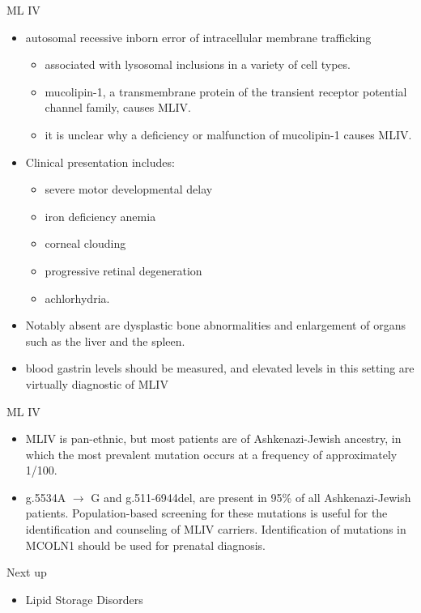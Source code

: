\documentclass[presentation, smaller]{beamer}
\begin{document}
\begin{frame}[label={sec:orgheadline14}]{ML IV}
\begin{itemize}
\item autosomal recessive inborn error of intracellular membrane trafficking
\begin{itemize}
\item associated with lysosomal inclusions in a variety of cell types.
\item mucolipin-1, a transmembrane protein of the transient receptor
potential channel family, causes MLIV.
\item it is unclear why a deficiency or malfunction of mucolipin-1 causes MLIV.
\end{itemize}

\item Clinical presentation includes:
\begin{itemize}
\item severe motor developmental delay
\item iron deficiency anemia
\item corneal clouding
\item progressive retinal degeneration
\item achlorhydria.
\end{itemize}

\item Notably absent are dysplastic bone abnormalities and enlargement of
organs such as the liver and the spleen.

\item blood gastrin levels should be measured, and elevated levels in
this setting are virtually diagnostic of MLIV
\end{itemize}
\end{frame}

\begin{frame}[label={sec:orgheadline15}]{ML IV}
\begin{itemize}
\item MLIV is pan-ethnic, but most patients are of Ashkenazi-Jewish
ancestry, in which the most prevalent mutation occurs at a frequency
of approximately 1/100.

\item g.5534A \(\to\) G and g.511-6944del, are present in 95\% of all
Ashkenazi-Jewish patients. Population-based screening for these
mutations is useful for the identification and counseling of MLIV
carriers. Identification of mutations in MCOLN1 should be used for
prenatal diagnosis.
\end{itemize}
\end{frame}


\begin{frame}[label={sec:orgheadline16}]{Next up}
\begin{itemize}
\item Lipid Storage Disorders
\end{itemize}
\end{frame}
\end{document}
